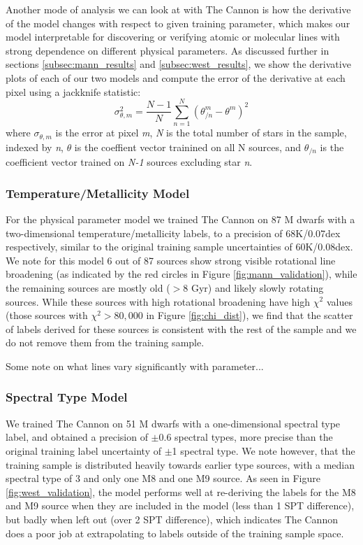 \documentclass[preprint]{aastex62}
\begin{document}
Another mode of analysis we can look at with The Cannon is how the derivative of the model changes with respect to given training parameter, which makes our model interpretable for discovering or verifying atomic or molecular lines with strong dependence on different physical parameters. As discussed further in sections \ref{subsec:mann_results} and \ref{subsec:west_results}, we show the derivative plots of each of our two models and compute the error of the derivative at each pixel using a jackknife statistic:
\begin{equation}
	\sigma_{\theta,m}^2 = \frac{N-1}{N} \sum^N_{n=1} (\theta_{/n}^m - \theta^m)^2 
\end{equation}
where $\sigma_{\theta,m}$ is the error at pixel \emph{m}, \emph{N} is the total number of stars in the sample, indexed by \emph{n}, $\theta$ is the coeffient vector trainined on all N sources, and $\theta_{/n}$ is the coefficient vector trained on \emph{N-1} sources excluding star \emph{n}.


\subsubsection{Temperature/Metallicity Model \label{subsec:mann_results}}
For the physical parameter model we trained The Cannon on 87 M dwarfs with a two-dimensional temperature/metallicity labels, to a precision of 68K/0.07dex respectively, similar to the original training sample uncertainties of 60K/0.08dex. We note for this model 6 out of 87 sources show strong visible rotational line broadening (as indicated by the red circles in Figure \ref{fig:mann_validation}), while the remaining sources are mostly old ($>8$ Gyr) and likely slowly rotating sources. While these sources with high rotational broadening have high $\chi^2$ values (those sources with $\chi^2 > 80,000$ in Figure \ref{fig:chi_dist}), we find that the scatter of labels derived for these sources is consistent with the rest of the sample and we do not remove them from the training sample.

Some note on what lines vary significantly with parameter...

\color{gcolor}{HOGG: Some commentary on why $\chi^2$ is higher than expected.}\color{black}

\subsubsection{Spectral Type Model \label{subsec:west_results}}
We trained The Cannon on 51 M dwarfs with a one-dimensional spectral type label, and obtained a precision of $\pm$0.6 spectral types, more precise than the original training label uncertainty of $\pm$1 spectral type. We note however, that the training sample is distributed heavily towards earlier type sources, with a median spectral type of 3 and only one M8 and one M9 source. As seen in Figure \ref{fig:west_validation}, the model performs well at re-deriving the labels for the M8 and M9 source when they are included in the model (less than 1 SPT difference), but badly when left out (over 2 SPT difference), which indicates The Cannon does a poor job at extrapolating to labels outside of the training sample space. 
\end{document}
